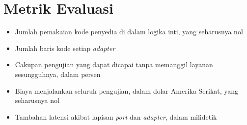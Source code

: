 \documentclass[11pt,a4paper]{article}
\begin{document}
\section{Metrik Evaluasi}

\begin{itemize}[leftmargin=*]
  \item Jumlah pemakaian kode penyedia di dalam logika inti, yang seharusnya nol
  \item Jumlah baris kode setiap \textit{adapter}
  \item Cakupan pengujian yang dapat dicapai tanpa memanggil layanan sesungguhnya, dalam persen
  \item Biaya menjalankan seluruh pengujian, dalam dolar Amerika Serikat, yang seharusnya nol
  \item Tambahan latensi akibat lapisan \textit{port} dan \textit{adapter}, dalam milidetik
\end{itemize}



\end{document}
